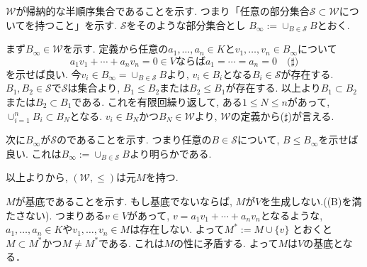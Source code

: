 \documentclass[dvipdfmx,a4paper,11pt]{article}
\theoremstyle{definition}
\begin{document}
$\mathcal{W}$が帰納的な半順序集合であることを示す.
つまり「任意の\boxed{\phantom{hogehoge}}部分集合$\mathcal{S} \subset \mathcal{W}$について\boxed{\phantom{hogehoge}}を持つこと」を示す. 
$\mathcal{S}$をそのような部分集合とし
$B_{\infty}:=\cup_{B \in \mathcal{S}}B\text{とおく.}$

まず$B_{\infty} \in\mathcal{W}$を示す. 
定義から任意の$a_1,\ldots, a_n \in K$と$v_1, \ldots, v_n \in B_{\infty}$について
$$a_1 v_1 + \cdots  + a_n v_n=0  \in V \text{ならば}
a_1 = \cdots = a_n=0
\quad \text{($\sharp$)}
$$
を示せば良い.
今$v_i \in B_{\infty}=\cup_{B \in \mathcal{S}}B$より, $v_i \in B_i$となる$B_i\in \mathcal{S}$が存在する.
$B_1, B_2 \in \mathcal{S}$で$\mathcal{S}$は\boxed{\phantom{hogehoge}}集合より, $B_1 \le B_2$または$B_2 \le B_1$が存在する.
以上より$B_1 \subset B_2$または$B_2 \subset B_1$である.
これを有限回繰り返して, ある$1 \le N \le n$があって, $\cup_{i=1}^{n}B_i \subset B_N$となる. 
$v_i \in B_N$かつ$B_N \in \mathcal{W}$より, $\mathcal{W}$の定義から($\sharp$)が言える. 

次に$B_{\infty}$が$\mathcal{S}$の\boxed{\phantom{hogehoge}}であることを示す. 
つまり任意の$B\in \mathcal{S}$について, $B \le B_{\infty}$を示せば良い. 
これは$B_{\infty}:=\cup_{B \in \mathcal{S}}B$より明らかである. 

以上より\boxed{\phantom{hogehoge}}から, $(\mathcal{W} ,\le)$は\boxed{\phantom{hogehoge}}元$M$を持つ. 

$M$が基底であることを示す.
もし基底でないならば, $M$が$V$を生成しない.((B)を満たさない).
つまりある$v \in V$があって, 
$v = a_1 v_1 + \cdots + a_n v_n$となるような, $a_1,\ldots, a_n \in K$や$v_1, \ldots, v_n \in M$は存在しない.
よって$M^{*}:= M \cup \{ v\}$
とおくと$M \subset M^{*}$かつ$M \neq M^{*}$である. 
これは$M$の\boxed{\phantom{hogehoge}}性に矛盾する.
よって$M$は$V$の基底となる． 
\end{document}
